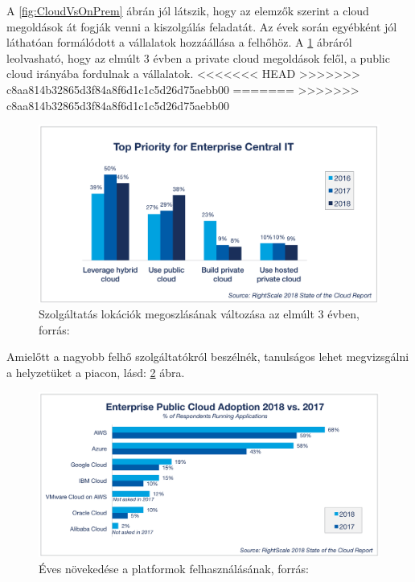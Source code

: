 \documentclass[12pt,oneside,justify,table]{book}
\begin{document}
A \ref{fig:CloudVsOnPrem} ábrán jól látszik, hogy az elemzők szerint a cloud megoldások át fogják venni a kiszolgálás feladatát. Az évek során egyébként jól láthatóan formálódott a vállalatok hozzáállása a felhőhöz. A \ref{fig:3yearCloudvsOnPrem} ábráról leolvasható, hogy az elmúlt 3 évben a private cloud megoldások felől, a public cloud irányába fordulnak a vállalatok.
<<<<<<< HEAD
>>>>>>> c8aa814b32865d3f84a8f6d1c1c5d26d75aebb00
=======
>>>>>>> c8aa814b32865d3f84a8f6d1c1c5d26d75aebb00
\begin{figure}[H]
\centering
\includegraphics[width=1\textwidth]{4-Cloud-Computing-Trends-Enterprises-Prioritizing-Public-Cloud.png}
\caption{Szolgáltatás lokációk megoszlásának változása az elmúlt 3 évben, forrás: \cite{RightScale}}
\label{fig:3yearCloudvsOnPrem}
\end{figure}

Amielőtt a nagyobb felhő szolgáltatókról beszélnék, tanulságos lehet megvizsgálni a helyzetüket a piacon, lásd: \ref{fig:CloudAdoption2017-2018} ábra.
\begin{figure}[H]
\centering
\includegraphics[width=1\textwidth]{22-Cloud-Computing-Trends-Enterprise-Public-Cloud-Adoption-2018-vs-2017.png}
\caption{Éves növekedése a platformok felhasználásának, forrás: \cite{RightScale}}
\label{fig:CloudAdoption2017-2018}
\end{figure}
\end{document}
